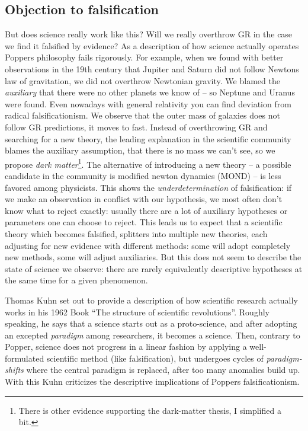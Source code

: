 \subsection{Objection to falsification}
But does science really work like this? Will we really overthrow GR
in the case we find it falsified by evidence?
As a description of how science actually operates Poppers
philosophy fails rigorously.
For example, when we found with better observations in the 19th century that Jupiter and Saturn
did not follow Newtons law of gravitation, we did not overthrow Newtonian gravity.
We blamed the \emph{auxiliary} that there were no other planets we know of --
so Neptune and Uranus were found.
Even nowadays with general relativity you can find deviation from
radical falsificationism.
We observe that the outer mass of galaxies does not
follow GR predictions, it moves to fast.
Instead of overthrowing GR and searching for a new theory,
the leading explanation in the scientific community
blames the auxiliary assumption, that there is no mass we can't see, so
we propose
\emph{dark matter}\footnote{There is other evidence supporting the dark-matter thesis, I simplified a bit.}.
The alternative of introducing a new theory
-- a possible candidate in the community is modified newton dynamics (MOND) --
is less favored among physicists.
This shows the \emph{underdetermination} of falsification:
if we make an observation in conflict with our hypothesis, we most often don't
know what to reject exactly: usually there are a lot of auxiliary hypotheses
or parameters one can choose to reject.
This leads us to expect that a scientific theory which becomes falsified,
splitters into multiple new theories, each adjusting for new evidence with
different methods: some will adopt completely new methods, some will
adjust auxiliaries.
But this does not seem to describe the state of science we observe:
there are rarely equivalently descriptive hypotheses at the same time
for a given phenomenon.

Thomas Kuhn set out to provide a description of how scientific
research actually works in his 1962 Book \enquote{The structure of scientific revolutions}.
Roughly speaking, he says that a science starts out as a proto-science, and
after adopting an excepted \emph{paradigm} among researchers,
it becomes a science.
Then, contrary to Popper, science does not progress in a linear
fashion by applying a well-formulated scientific method (like falsification),
but undergoes cycles of \emph{paradigm-shifts} where the central paradigm
is replaced, after too many anomalies build up.
With this Kuhn criticizes the descriptive implications
of Poppers falsificationism.


